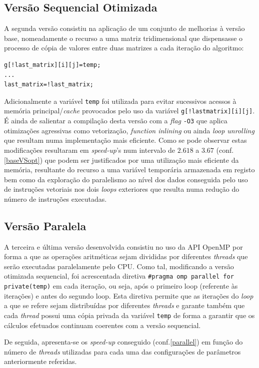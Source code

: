\documentclass{article}
\begin{document}
\subsection{Versão Sequencial Otimizada}
A segunda versão consistiu na aplicação de um conjunto de melhorias à versão base, nomeadamente o recurso a uma matriz tridimensional que dispensasse o processo de 
cópia de valores entre duas matrizes a cada iteração do algoritmo:
\begin{Verbatim}
g[!last_matrix][i][j]=temp;
...
last_matrix=!last_matrix;
\end{Verbatim}
Adicionalmente a variável \texttt{temp} foi utilizada para evitar sucessivos acessos à memória principal/\textit{cache} provocados pelo uso da variável \texttt{g[!lastmatrix][i][j]}.
É ainda de salientar a compilação desta versão com a \textit{flag} \texttt{-O3} que aplica otimizações agressivas como vetorização, \textit{function inlining} ou ainda
\textit{loop unrolling} que resultam numa implementação mais eficiente. Como se pode observar estas modificações resultaram em \textit{speed-up}'s num intervalo de 
$2.618$ a $3.67$ (conf.\ref{baseVSopt}) que podem ser justificados por uma utilização mais eficiente da memória, resultante do recurso a uma variável temporária armazenada em registo bem 
como da exploração do paralelismo ao nível dos dados conseguida pelo uso de instruções vetoriais nos dois \textit{loops} exteriores que resulta numa redução do número de instruções executadas.

\subsection{Versão Paralela}

A terceira e última versão desenvolvida consistiu no uso da API OpenMP por forma a que as operações aritméticas sejam divididas por diferentes \textit{threads} que 
serão executadas paralelamente pelo CPU. Como tal, modificando a versão otimizada sequencial, foi acrescentada diretiva \verb|#pragma omp parallel for private(temp)| 
em cada iteração, ou seja, após o primeiro loop (referente às iterações) e antes do segundo loop. Esta diretiva permite que as iterações do \textit{loop} a que se 
refere sejam distribuídas por diferentes \textit{threads} e garante também que cada \textit{thread} possui uma cópia privada da variável \texttt{temp} de forma a 
garantir que os cálculos efetuados continuam coerentes com a versão sequencial.

De seguida, apresenta-se os \textit{speed-up} conseguido (conf.\ref{parallel}) em função do número de \textit{threads} utilizadas para cada uma das configurações de 
parâmetros anteriormente referidas.
\end{document}
